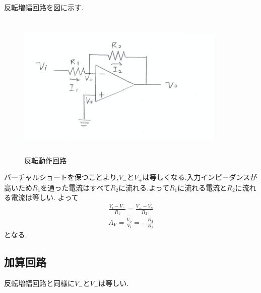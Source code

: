 \documentclass[a4j,10pt,dvipdfmx]{jarticle}
\begin{document}
反転増幅回路を図に示す.
\begin{figure}[H]
  \begin{center}
  \includegraphics[height=7cm,width=10cm]{hanpuku.png}
  \caption{反転動作回路}
\end{center}
\end{figure}
バーチャルショートを保つことより,$V_-$と$V_+$は等しくなる.入力インピーダンスが高いため$R_1$を通った電流はすべて$R_2$に流れる.よって$R_1$に流れる電流と$R_2$に流れる電流は等しい.
よって
\begin{eqnarray}
  \label{icib}
\frac{{V_i}-{V_-}}{R_1} = \frac{{V_-}-{V_o}}{R_2} 
\end{eqnarray}
\begin{eqnarray}
  \label{Av}
A_V=\frac{V_o}{V_i} = -\frac{R_2}{R_1} 
\end{eqnarray}
となる.
\subsection{加算回路}
反転増幅回路と同様に$V_-$と$V_+$は等しい.
\end{document}
